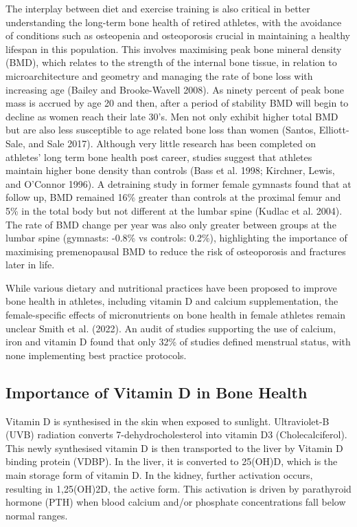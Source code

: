 \documentclass[
]{article}
\begin{document}
The interplay between diet and exercise training is also critical in better understanding the long-term bone health of retired athletes, with the avoidance of conditions such as osteopenia and osteoporosis crucial in maintaining a healthy lifespan in this population. This involves maximising peak bone mineral density (BMD), which relates to the strength of the internal bone tissue, in relation to microarchitecture and geometry and managing the rate of bone loss with increasing age (Bailey and Brooke-Wavell 2008). As ninety percent of peak bone mass is accrued by age 20 and then, after a period of stability BMD will begin to decline as women reach their late 30's. Men not only exhibit higher total BMD but are also less susceptible to age related bone loss than women (Santos, Elliott-Sale, and Sale 2017). Although very little research has been completed on athletes' long term bone health post career, studies suggest that athletes maintain higher bone density than controls (Bass et al. 1998; Kirchner, Lewis, and O'Connor 1996). A detraining study in former female gymnasts found that at follow up, BMD remained 16\% greater than controls at the proximal femur and 5\% in the total body but not different at the lumbar spine (Kudlac et al. 2004). The rate of BMD change per year was also only greater between groups at the lumbar spine (gymnasts: -0.8\% vs controls: 0.2\%), highlighting the importance of maximising premenopausal BMD to reduce the risk of osteoporosis and fractures later in life.

While various dietary and nutritional practices have been proposed to improve bone health in athletes, including vitamin D and calcium supplementation, the female-specific effects of micronutrients on bone health in female athletes remain unclear Smith et al. (2022). An audit of studies supporting the use of calcium, iron and vitamin D found that only 32\% of studies defined menstrual status, with none implementing best practice protocols.

\subsection{Importance of Vitamin D in Bone Health}\label{importance-of-vitamin-d-in-bone-health}

Vitamin D is synthesised in the skin when exposed to sunlight. Ultraviolet-B (UVB) radiation converts 7-dehydrocholesterol into vitamin D3 (Cholecalciferol). This newly synthesised vitamin D is then transported to the liver by Vitamin D binding protein (VDBP). In the liver, it is converted to 25(OH)D, which is the main storage form of vitamin D. In the kidney, further activation occurs, resulting in 1,25(OH)2D, the active form. This activation is driven by parathyroid hormone (PTH) when blood calcium and/or phosphate concentrations fall below normal ranges.
\end{document}
